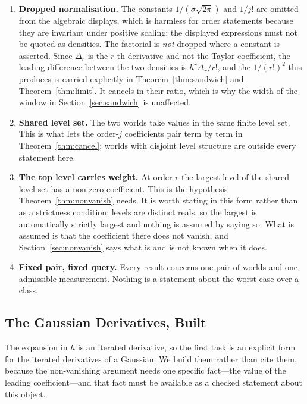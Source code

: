 \begin{enumerate}
\item[1)] \textbf{Dropped normalisation.} The constants $1/(\sigma\sqrt{2\pi})$ and $1/j!$ are
omitted from the algebraic displays, which is harmless for order statements because they are
invariant under positive scaling; the displayed expressions must not be quoted as densities.
The factorial is \emph{not} dropped where a constant is asserted. Since $\Delta_{r}$ is the
$r$-th derivative and not the Taylor coefficient, the leading difference between the two
densities is $h^{r}\Delta_{r}/r!$, and the $1/(r!)^{2}$ this produces is carried explicitly in
Theorem~\ref{thm:sandwich} and Theorem~\ref{thm:limit}. It cancels in their ratio, which is
why the width of the window in Section~\ref{sec:sandwich} is unaffected.

\item[2)] \textbf{Shared level set.} The two worlds take values in the same finite level
set. This is what lets the order-$j$ coefficients pair term by term in
Theorem~\ref{thm:cancel}; worlds with disjoint level structure are outside every statement
here.

\item[3)] \textbf{The top level carries weight.} At order $r$ the largest level of the shared
level set has a non-zero coefficient. This is the hypothesis
Theorem~\ref{thm:nonvanish} needs. It is worth stating in this form rather than as a
strictness condition: levels are distinct reals, so the largest is automatically strictly
largest and nothing is assumed by saying so. What is assumed is that the coefficient there
does not vanish, and Section~\ref{sec:nonvanish} says what is and is not known when it does.

\item[4)] \textbf{Fixed pair, fixed query.} Every result concerns one pair of worlds and one
admissible measurement. Nothing is a statement about the worst case over a class.
\end{enumerate}

\subsection{The Gaussian Derivatives, Built}
\label{sec:hermite}

The expansion in $h$ is an iterated derivative, so the first task is an explicit form for the
iterated derivatives of a Gaussian. We build them rather than cite them, because the
non-vanishing argument needs one specific fact---the value of the leading coefficient---and
that fact must be available as a checked statement about this object.

